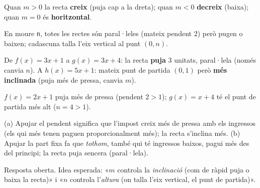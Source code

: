 \begin{solucions}
\begin{sollist}
  \item Quan $m>0$ la recta \textbf{creix} (puja cap a la dreta); quan $m<0$
        \textbf{decreix} (baixa); quan $m=0$ és \textbf{horitzontal}.
  \item En moure \texttt{n}, totes les rectes són paral·leles (mateix pendent $2$)
        però pugen o baixen; cadascuna talla l'eix vertical al punt $(0,n)$.
  \item De $f(x)=3x+1$ a $g(x)=3x+4$: la recta \textbf{puja} $3$ unitats, paral·lela
        (només canvia $n$). A $h(x)=5x+1$: mateix punt de partida $(0,1)$ però
        \textbf{més inclinada} (puja més de pressa, canvia $m$).
  \item $f(x)=2x+1$ puja més de pressa (pendent $2>1$); $g(x)=x+4$ té el punt de
        partida més alt ($n=4>1$).
  \item (a) Apujar el pendent significa que l'impost creix més de pressa amb els
        ingressos (els qui més tenen paguen proporcionalment més); la recta s'inclina
        més. (b) Apujar la part fixa fa que \emph{tothom}, també qui té ingressos
        baixos, pagui més des del principi; la recta puja sencera (paral·lela).
  \item Resposta oberta. Idea esperada: «$m$ controla la \emph{inclinació} (com de
        ràpid puja o baixa la recta)» i «$n$ controla l'\emph{altura} (on talla l'eix
        vertical, el punt de partida)».
\end{sollist}
\end{solucions}
